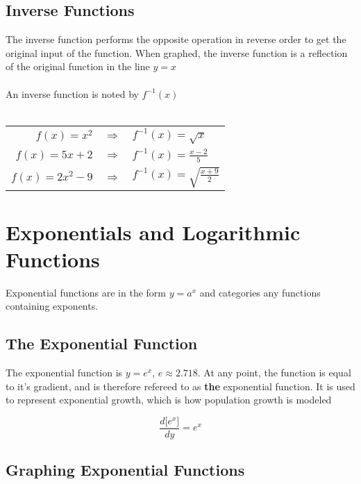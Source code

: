\documentclass{article}
\begin{document}
	\subsection{Inverse Functions} \label{subsec:inverse}
	The inverse function performs the opposite operation in reverse order to get the original input of the function. When graphed, the inverse function is a reflection of the original function in the line $y=x$
	\\\\
	An inverse function is noted by $f^{-1}(x)$
	\\\\
	\begin{center}
		\begin{tabular}{rcl}
			$f(x)=x^2$ & $\Rightarrow$ & $f^{-1}(x)=\sqrt{x}$ \\
			$f(x)=5x+2$ & $\Rightarrow$ & $\displaystyle{ f^{-1}(x)=\frac{x-2}{5}}$ \\
			$f(x)=2x^2-9$ & $\Rightarrow$ & $\displaystyle{f^{-1}(x)=\sqrt{\frac{x+9}{2}}}$
		\end{tabular}
	\end{center}
	\newpage
	\section{Exponentials and Logarithmic Functions}
	Exponential functions are in the form $y=a^x$ and categories any functions containing exponents. 
	\subsection{The Exponential Function}
	The exponential function is $y=e^x$, $e \approx 2.718$. At any point, the function is equal to it's gradient, and is therefore refereed to as \textbf{the} exponential function. It is used to represent exponential growth, which is how population growth is modeled 
	\begin{center}
		$$\frac{d\lbrack e^x \rbrack}{dy}=e^x$$ 
	\end{center}
	\subsection{Graphing Exponential Functions}
	\begin{center}
	\end{center}
\end{document}
